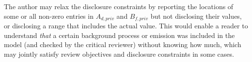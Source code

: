 The author may relax the disclosure constraints by reporting the locations of some or all non-zero entries in $A_{d,priv}$ and $B_{f,priv}$ but not disclosing their values, or disclosing a range that includes the actual value.  This would enable a reader to understand \emph{that} a certain background process or emission was included in the model (and checked by the critical reviewer) without knowing how much, which may jointly satisfy review objectives and disclosure constraints in some cases.  
